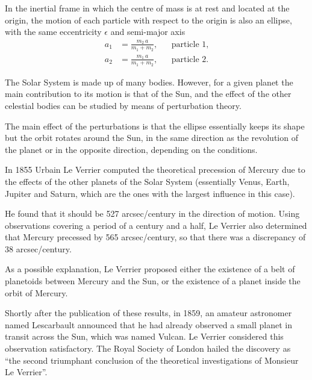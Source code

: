 \begin{points}
\item In the inertial frame in which the centre of mass is at rest and located at the origin, the motion of each particle with respect to the origin is also an ellipse, with the same eccentricity $\epsilon$ and semi-major axis
\begin{align*}
  a_1&=\frac{m_2\,a}{m_1+m_2}, &&\text{particle 1},\\
  a_2&=\frac{m_1\,a}{m_1+m_2}, &&\text{particle 2}.
\end{align*}

\item The Solar System is made up of many bodies. However, for a given planet the main contribution to its motion is that of the Sun, and the effect of the other celestial bodies can be studied by means of perturbation theory.

\item The main effect of the perturbations is that the ellipse essentially keeps its shape but the orbit rotates around the Sun, in the same direction as the revolution of the planet or in the opposite direction, depending on the conditions.

\item In 1855 Urbain Le Verrier computed the theoretical precession of Mercury due to the effects of the other planets of the Solar System (essentially Venus, Earth, Jupiter and Saturn, which are the ones with the largest influence in this case).

\item He found that it should be 527 arcsec/century in the direction of motion. Using observations covering a period of a century and a half, Le Verrier also determined that Mercury precessed by 565 arcsec/century, so that there was a discrepancy of 38 arcsec/century.

\item As a possible explanation, Le Verrier proposed either the existence of a belt of planetoids between Mercury and the Sun, or the existence of a planet inside the orbit of Mercury.

\item Shortly after the publication of these results, in 1859, an amateur astronomer named Lescarbault announced that he had already observed a small planet in transit across the Sun, which was named Vulcan. Le Verrier considered this observation satisfactory. The Royal Society of London hailed the discovery as ``the second triumphant conclusion of the theoretical investigations of Monsieur Le Verrier''.


\end{points}

